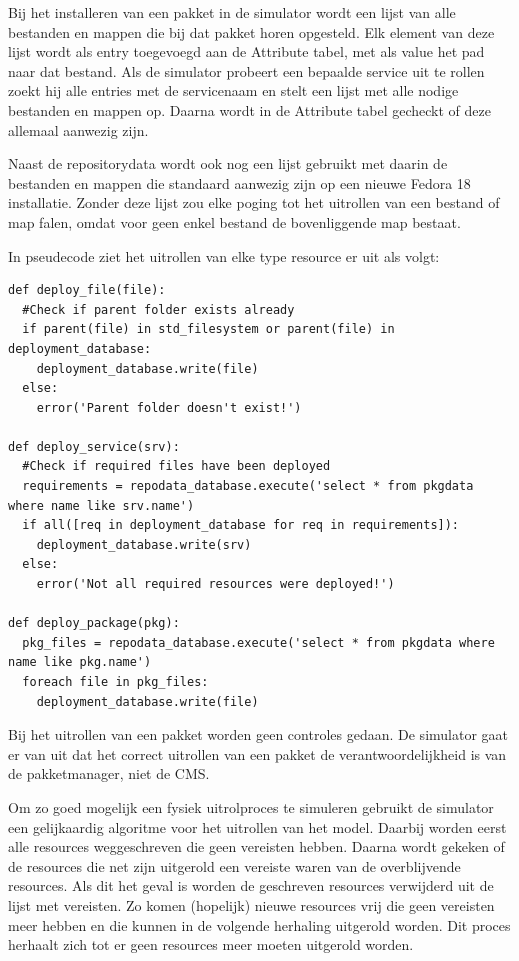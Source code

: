 Bij het installeren van een pakket in de simulator wordt een lijst van alle bestanden en mappen die bij dat pakket horen opgesteld.
Elk element van deze lijst wordt als entry toegevoegd aan de Attribute tabel, met als value het pad naar dat bestand.
Als de simulator probeert een bepaalde service uit te rollen zoekt hij alle entries met de servicenaam en stelt een lijst met alle nodige bestanden en mappen op.
Daarna wordt in de Attribute tabel gecheckt of deze allemaal aanwezig zijn.

Naast de repositorydata wordt ook nog een lijst gebruikt met daarin de bestanden en mappen die standaard aanwezig zijn op een nieuwe Fedora 18 installatie.
Zonder deze lijst zou elke poging tot het uitrollen van een bestand of map falen, omdat voor geen enkel bestand de bovenliggende map bestaat.

In pseudecode ziet het uitrollen van elke type resource er uit als volgt:

\begin{lstlisting}[showstringspaces=false]
def deploy_file(file):
  #Check if parent folder exists already
  if parent(file) in std_filesystem or parent(file) in deployment_database:
    deployment_database.write(file)
  else:
    error('Parent folder doesn't exist!')

def deploy_service(srv):
  #Check if required files have been deployed
  requirements = repodata_database.execute('select * from pkgdata where name like srv.name')
  if all([req in deployment_database for req in requirements]):
    deployment_database.write(srv)
  else:
    error('Not all required resources were deployed!')

def deploy_package(pkg):
  pkg_files = repodata_database.execute('select * from pkgdata where name like pkg.name') 
  foreach file in pkg_files:
    deployment_database.write(file)
\end{lstlisting}

Bij het uitrollen van een pakket worden geen controles gedaan. 
De simulator gaat er van uit dat het correct uitrollen van een pakket de verantwoordelijkheid is van de pakketmanager, niet de CMS.

Om zo goed mogelijk een fysiek uitrolproces te simuleren gebruikt de simulator een gelijkaardig algoritme voor het uitrollen van het model.
Daarbij worden eerst alle resources weggeschreven die geen vereisten hebben.
Daarna wordt gekeken of de resources die net zijn uitgerold een vereiste waren van de overblijvende resources.
Als dit het geval is worden de geschreven resources verwijderd uit de lijst met vereisten.
Zo komen (hopelijk) nieuwe resources vrij die geen vereisten meer hebben en die kunnen in de volgende herhaling uitgerold worden.
Dit proces herhaalt zich tot er geen resources meer moeten uitgerold worden.

